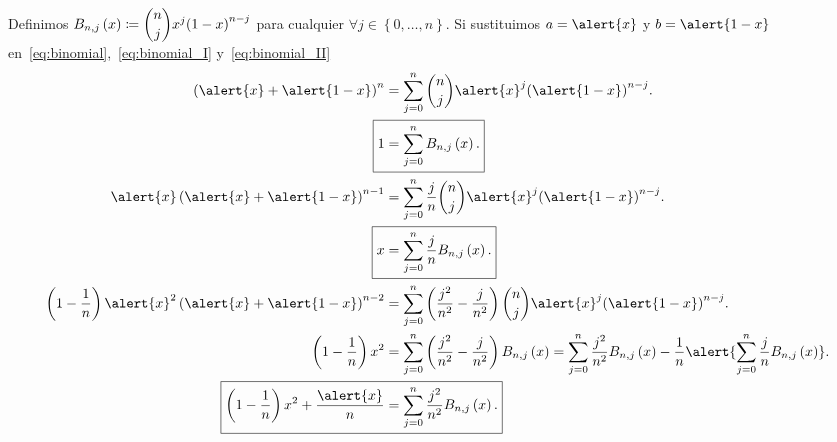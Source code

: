 \begin{frame}
	Definimos
	\begin{math}
		B_{n,j}\left(x\right)\coloneqq
		\dbinom{n}{j}
		x^{j}
			{\left(1-x\right)}^{n-j}
	\end{math}
	para cualquier
	\begin{math}
		\forall j\in\left\{0,\dotsc,n\right\}
	\end{math}.
	Si sustituimos $a=\alert{x}$ y $b=\alert{1-x}$
	en~\eqref{eq:binomial},~\eqref{eq:binomial_I}
	y~\eqref{eq:binomial_II}
	\begin{align}
		\left(\alert{x}+\alert{1-x}\right)^{n} & =
		\sum\limits_{j=0}^{n}
		\dbinom{n}{j}
		\alert{x}^{j}
		{\left(\alert{1-x}\right)}^{n-j}. \notag   \\
		\Aboxed{
		1                                      & =
			\sum\limits_{j=0}^{n}
			B_{n,j}\left(x\right).
		}                                          \\
		\alert{x}\left(\alert{x}+\alert{1-x}\right)^{n-1}
		                                       & =
		\sum\limits_{j=0}^{n}
		\dfrac{j}{n}
		\dbinom{n}{j}
		\alert{x}^{j}
		{\left(\alert{1-x}\right)}^{n-j}. \notag   \\
		\Aboxed{
			x
		                                       & =
			\sum\limits_{j=0}^{n}
			\dfrac{j}{n}
			B_{n,j}\left(x\right).
		}                                          \\
		\left(1-\dfrac{1}{n}\right)
		\alert{x}^{2}
		\left(\alert{x}+\alert{1-x}\right)^{n-2}
		                                       & =
		\sum\limits_{j=0}^{n}
		\left(
		\dfrac{j^{2}}{n^{2}}-
		\dfrac{j}{n^{2}}
		\right)
		\dbinom{n}{j}
		\alert{x}^{j}
		{\left(\alert{1-x}\right)}^{n-j}.
		\notag                                     \\
		\left(1-\dfrac{1}{n}\right)
		x^{2}
		                                       & =
		\sum\limits_{j=0}^{n}
		\left(
		\dfrac{j^{2}}{n^{2}}-
		\dfrac{j}{n^{2}}
		\right)
		B_{n,j}\left(x\right)=
		\sum\limits_{j=0}^{n}
		\dfrac{j^{2}}{n^{2}}
		B_{n,j}\left(x\right)-
		\frac{1}{n}
		\alert{
			\sum\limits_{j=0}^{n}
			\dfrac{j}{n}
			B_{n,j}\left(x\right)
		}.
		\notag                                     \\
		\Aboxed{
			\left(1-\dfrac{1}{n}\right)
			x^{2}+
			\dfrac{\alert{x}}{n}
		                                       & =
			\sum\limits_{j=0}^{n}
			\dfrac{j^{2}}{n^{2}}
			B_{n,j}\left(x\right).
		}
	\end{align}
\end{frame}

